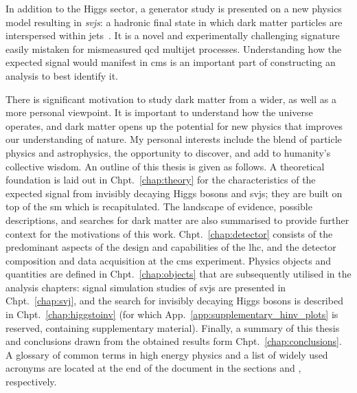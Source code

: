 In addition to the Higgs sector, a generator study is presented on a new physics model resulting in \emph{\glspl{svj}}: a hadronic final state in which dark matter particles are interspersed within \glspl{jet}~\cite{Cohen:2015toa,Cohen:2017pzm}. It is a novel and experimentally challenging signature easily mistaken for mismeasured \acrshort{qcd} multijet processes. Understanding how the expected signal would manifest in \acrshort{cms} is an important part of constructing an analysis to best identify it.

There is significant motivation to study dark matter from a wider, as well as a more personal viewpoint. It is important to understand how the universe operates, and dark matter opens up the potential for new physics that improves our understanding of nature. My personal interests include the blend of particle physics and astrophysics, the opportunity to discover, and add to humanity's collective wisdom. An outline of this thesis is given as follows. A theoretical foundation is laid out in Chpt.~\ref{chap:theory} for the characteristics of the expected signal from invisibly decaying Higgs bosons and \glspl{svj}; they are built on top of the \acrlong{sm} which is recapitulated. The landscape of evidence, possible descriptions, and searches for dark matter are also summarised to provide further context for the motivations of this work. Chpt.~\ref{chap:detector} consists of the predominant aspects of the design and capabilities of the \acrlong{lhc}, and the detector composition and data acquisition at the \acrshort{cms} experiment. Physics objects and quantities are defined in Chpt.~\ref{chap:objects} that are subsequently utilised in the analysis chapters: signal simulation studies of \glspl{svj} are presented in Chpt.~\ref{chap:svj}, and the search for invisibly decaying Higgs bosons is described in Chpt.~\ref{chap:higgstoinv} (for which App.~\ref{app:supplementary_hinv_plots} is reserved, containing supplementary material). Finally, a summary of this thesis and conclusions drawn from the obtained results form Chpt.~\ref{chap:conclusions}. A glossary of common terms in high energy physics and a list of widely used acronyms are located at the end of the document in the sections  and , respectively.
